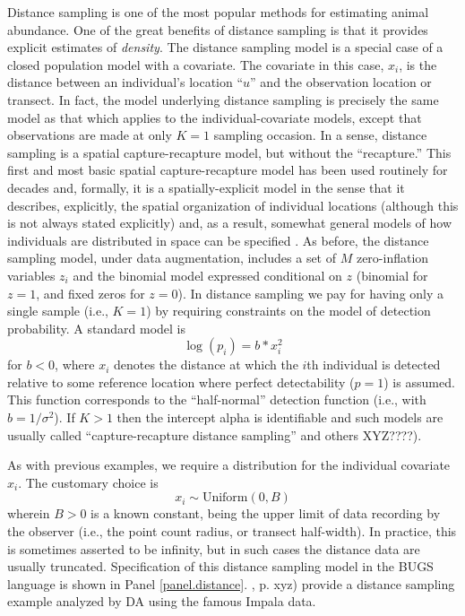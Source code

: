 Distance sampling is one of the most popular methods for estimating
animal abundance. One of the great benefits of distance sampling is
that it provides explicit estimates of {\it density}. The distance
sampling model is a special case of a closed population model with a
covariate. The covariate in this case, $x_{i}$, is the distance
between an individual's location ``$u$'' and the observation location
or transect. In fact, the model underlying distance sampling is
precisely the same model as that which applies to the
individual-covariate models, except that observations are made at only
$K=1$ sampling occasion. In a sense, distance sampling is a spatial
capture-recapture model, but without the ``recapture.''  This first
and most basic spatial capture-recapture model has been used routinely
for decades and, formally, it is a spatially-explicit model in the
sense that it describes, explicitly, the spatial organization of
individual locations (although this is not always stated explicitly)
and, as a result, somewhat general models of how individuals are
distributed in space can be specified \citep{royle_etal:2004,
  johnson_etal:2010, sillett_etal:2011}.
As before, the distance sampling model, under data augmentation, includes a set of $M$ zero-inflation variables $z_{i}$ and the binomial model expressed conditional on $z$ (binomial for $z=1$, and fixed zeros for $z=0$).  In distance sampling we pay for having only a single sample (i.e., $K=1$) by requiring constraints on the model of detection probability. A standard model is
\[
\log(p_{i}) = b * x_{i}^{2}
\]
for $b < 0$, where $x_i$ denotes the distance at which the $i$th
individual is detected relative to some reference location where
perfect detectability ($p=1$) is assumed. This function corresponds to
the ``half-normal'' detection function (i.e., with $b =
1/\sigma^{2}$).  If $K>1$ then the intercept alpha is identifiable and
such models are usually called ``capture-recapture distance
sampling''\citep{borchers_etal:XXXX} and others XYZ????).

As with previous examples, we require a distribution for the individual covariate $x_{i}$. The customary choice is
\[
x_{i} \sim \mbox{Uniform}(0,B)
\]
wherein $B>0$ is a known constant, being the upper limit of data
recording by the observer (i.e., the point count radius, or transect
half-width). In practice, this is sometimes asserted to be infinity,
but in such cases the distance data are usually truncated.
Specification of this distance sampling model in the BUGS language is
shown in Panel \ref{panel.distance}. \citet{royle_dorazio:2008}, p. xyz) provide a distance sampling example analyzed by DA using the famous Impala data.


